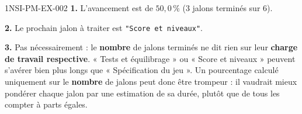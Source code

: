 \begin{corrige}{1NSI-PM-EX-002}
\textbf{1.} L'avancement est de $50{,}0\,\%$ ($3$ jalons terminés sur $6$).

\textbf{2.} Le prochain jalon à traiter est \lstinline{"Score et niveaux"}.

\textbf{3.} Pas nécessairement : le \textbf{nombre} de jalons terminés ne dit rien sur leur
\textbf{charge de travail respective}. « Tests et équilibrage » ou « Score et niveaux »
peuvent s'avérer bien plus longs que « Spécification du jeu ». Un pourcentage calculé
uniquement sur le \textbf{nombre} de jalons peut donc être trompeur : il vaudrait mieux
pondérer chaque jalon par une estimation de sa durée, plutôt que de tous les compter à
parts égales.
\end{corrige}
